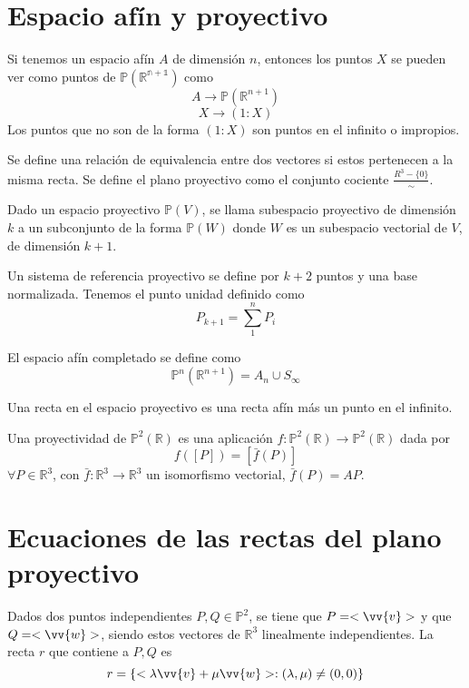 \documentclass{Geometria.tex}
\begin{document}
\section{Espacio afín y proyectivo}
Si tenemos un espacio afín \(A\) de dimensión \(n\), entonces los puntos \(X\) se pueden ver como
puntos de \(\mathbb{P(R^{n+1})}\) como
\[
    A \to  \mathbb{P}(\mathbb{R}^{n+1})
\]
\[
    X \to (1: X)
\]
Los puntos que no son de la forma \((1:X)\) son puntos en el infinito o impropios.
\begin{defin}
    Se define una relación de equivalencia entre dos vectores si estos pertenecen a la misma recta.
    Se define el plano proyectivo como el conjunto cociente \(\frac{R^{3} - \{ 0 \}}{\sim}\).
\end{defin}
\begin{defin}
    Dado un espacio proyectivo \(\mathbb{P}(V)\), se llama subespacio proyectivo de dimensión \(k\)
    a un subconjunto de la forma \(\mathbb{P}(W)\) donde \(W\) es un subespacio vectorial
    de \(V\), de dimensión \(k+1\).
\end{defin}
\begin{defin}
    Un sistema de referencia proyectivo se define por \(k+2\) puntos y una base normalizada. Tenemos
    el punto unidad definido como
    \[
        P_{k+1} = \sum _{1}^{n} P_{i}
    \]
\end{defin}
\begin{defin}
    El espacio afín completado se define como
    \[
        \mathbb{P}^n(\mathbb{R}^{n+1}) = A_{n} \cup S_{\infty}
    \]
\end{defin}
Una recta en el espacio proyectivo es una recta afín más un punto en el infinito.
\begin{defin}
    Una proyectividad de \(\mathbb{P}^{2} (\mathbb{R})\) es una aplicación \(f: \mathbb{P}^{2}(\mathbb{R})
    \to  \mathbb{P}^{2}(\mathbb{R})\) dada por
    \[
        f([P]) = [\bar{f}(P)]
    \]
    \(\forall P \in \mathbb{R}^{3}\), con \(\bar{f}: \mathbb{R}^{3} \to  \mathbb{R}^{3}\) un
    isomorfismo vectorial, \(\bar{f}(P) = AP\).
\end{defin}
\section{Ecuaciones de las rectas del plano proyectivo}
Dados dos puntos independientes $P,Q \in \mathbb{P} ^{2}$, se tiene que
$P = <\vv{v}>$ y que $Q = <\vv{w}>$, siendo estos vectores de $\mathbb{R}^{3}$
linealmente independientes. La recta $r$ que contiene a $P,Q$ es
\[
	r = \{ <\lambda \vv{v} + \mu \vv{w}>: (\lambda,\mu) \neq (0,0) \}
\]
\end{document}
